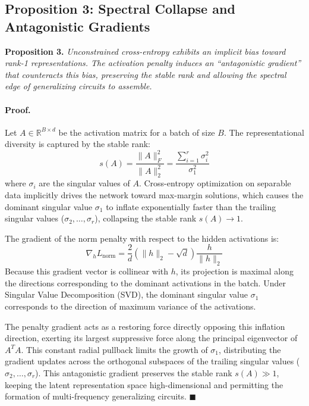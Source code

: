 \documentclass[11pt,a4paper]{article}
\begin{document}
\subsection{Proposition 3: Spectral Collapse and Antagonistic Gradients}
\textbf{Proposition 3.} \textit{Unconstrained cross-entropy exhibits an implicit bias toward rank-1 representations. The activation penalty induces an ``antagonistic gradient'' that counteracts this bias, preserving the stable rank and allowing the spectral edge of generalizing circuits to assemble.}

\paragraph{Proof.} Let $A \in \mathbb{R}^{B \times d}$ be the activation matrix for a batch of size $B$. The representational diversity is captured by the stable rank:
\begin{equation}
s(A) = \frac{\|A\|_F^2}{\|A\|_2^2} = \frac{\sum_{i=1}^r \sigma_i^2}{\sigma_1^2}
\end{equation}
where $\sigma_i$ are the singular values of $A$. Cross-entropy optimization on separable data implicitly drives the network toward max-margin solutions, which causes the dominant singular value $\sigma_1$ to inflate exponentially faster than the trailing singular values ($\sigma_2, \dots, \sigma_r$), collapsing the stable rank $s(A) \to 1$.

The gradient of the norm penalty with respect to the hidden activations is:
\begin{equation}
\nabla_h L_{\text{norm}} = \frac{2}{d}(\|h\|_2 - \sqrt{d})\frac{h}{\|h\|_2}
\end{equation}
Because this gradient vector is collinear with $h$, its projection is maximal along the directions corresponding to the dominant activations in the batch. Under Singular Value Decomposition (SVD), the dominant singular value $\sigma_1$ corresponds to the direction of maximum variance of the activations.

The penalty gradient acts as a restoring force directly opposing this inflation direction, exerting its largest suppressive force along the principal eigenvector of $A^T A$. This constant radial pullback limits the growth of $\sigma_1$, distributing the gradient updates across the orthogonal subspaces of the trailing singular values ($\sigma_2, \dots, \sigma_r$). This antagonistic gradient preserves the stable rank $s(A) \gg 1$, keeping the latent representation space high-dimensional and permitting the formation of multi-frequency generalizing circuits. $\blacksquare$
\end{document}
